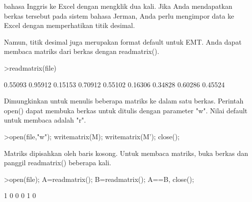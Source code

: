 \documentclass[a4paper,10pt]{article}
\begin{document}
\begin{eulernotebook}
\begin{eulercomment}
\begin{eulercomment}
\begin{eulercomment}
\begin{eulercomment}
\begin{eulercomment}
\begin{eulercomment}
\begin{eulercomment}
\begin{eulercomment}
\begin{eulercomment}
\begin{eulercomment}
\begin{eulercomment}
\begin{eulercomment}
\begin{eulercomment}
\begin{eulercomment}
\begin{eulercomment}
\begin{eulercomment}
\begin{eulercomment}
\begin{eulercomment}
\begin{eulercomment}
\begin{eulercomment}
\begin{eulercomment}
\begin{eulercomment}
\begin{eulercomment}
\begin{eulercomment}
\begin{eulercomment}
\begin{eulercomment}
\begin{eulercomment}
\begin{eulercomment}
\begin{eulercomment}
\begin{eulercomment}
\begin{eulercomment}
\begin{eulercomment}
\begin{eulercomment}
\begin{eulercomment}
\begin{eulercomment}
\begin{eulercomment}
\begin{eulercomment}
\begin{eulercomment}
\begin{eulercomment}
\begin{eulercomment}
\begin{eulercomment}
\begin{eulercomment}
\begin{eulercomment}
\begin{eulercomment}
\begin{eulercomment}
\begin{eulercomment}
\begin{eulercomment}
\begin{eulercomment}
\begin{eulercomment}
\begin{eulercomment}
\begin{eulercomment}
\begin{eulercomment}
\begin{eulercomment}
\begin{eulercomment}
\begin{eulercomment}
\begin{eulercomment}
\begin{eulercomment}
\begin{eulercomment}
\begin{eulercomment}
\begin{eulercomment}
\begin{eulercomment}
\begin{eulercomment}
\begin{eulercomment}
\begin{eulercomment}
\begin{eulercomment}
\begin{eulercomment}
\begin{eulercomment}
\begin{eulercomment}
\begin{eulercomment}
\begin{eulercomment}
\begin{eulercomment}
bahasa Inggris ke Excel dengan
mengklik dua kali. Jika Anda mendapatkan berkas tersebut pada sistem
bahasa Jerman, Anda perlu mengimpor data ke Excel dengan memperhatikan
titik desimal.

Namun, titik desimal juga merupakan format default untuk EMT. Anda
dapat membaca matriks dari berkas dengan readmatrix().
\end{eulercomment}
\begin{eulerprompt}
>readmatrix(file)
\end{eulerprompt}
\begin{euleroutput}
    0.55093   0.95912   0.15153 
    0.70912   0.55102   0.16306 
    0.34828   0.60286   0.45524 
\end{euleroutput}
\begin{eulercomment}
Dimungkinkan untuk menulis beberapa matriks ke dalam satu berkas.
Perintah open() dapat membuka berkas untuk ditulis dengan parameter
"w". Nilai default untuk membaca adalah "r".
\end{eulercomment}
\begin{eulerprompt}
>open(file,"w"); writematrix(M); writematrix(M'); close();
\end{eulerprompt}
\begin{eulercomment}
Matriks dipisahkan oleh baris kosong. Untuk membaca matriks, buka
berkas dan panggil readmatrix() beberapa kali.
\end{eulercomment}
\begin{eulerprompt}
>open(file); A=readmatrix(); B=readmatrix(); A==B, close();
\end{eulerprompt}
\begin{euleroutput}
          1         0         0 
          0         1         0 
     
\end{euleroutput}
\end{eulercomment}
\end{eulercomment}
\end{eulercomment}
\end{eulercomment}
\end{eulercomment}
\end{eulercomment}
\end{eulercomment}
\end{eulercomment}
\end{eulercomment}
\end{eulercomment}
\end{eulercomment}
\end{eulercomment}
\end{eulercomment}
\end{eulercomment}
\end{eulercomment}
\end{eulercomment}
\end{eulercomment}
\end{eulercomment}
\end{eulercomment}
\end{eulercomment}
\end{eulercomment}
\end{eulercomment}
\end{eulercomment}
\end{eulercomment}
\end{eulercomment}
\end{eulercomment}
\end{eulercomment}
\end{eulercomment}
\end{eulercomment}
\end{eulercomment}
\end{eulercomment}
\end{eulercomment}
\end{eulercomment}
\end{eulercomment}
\end{eulercomment}
\end{eulercomment}
\end{eulercomment}
\end{eulercomment}
\end{eulercomment}
\end{eulercomment}
\end{eulercomment}
\end{eulercomment}
\end{eulercomment}
\end{eulercomment}
\end{eulercomment}
\end{eulercomment}
\end{eulercomment}
\end{eulercomment}
\end{eulercomment}
\end{eulercomment}
\end{eulercomment}
\end{eulercomment}
\end{eulercomment}
\end{eulercomment}
\end{eulercomment}
\end{eulercomment}
\end{eulercomment}
\end{eulercomment}
\end{eulercomment}
\end{eulercomment}
\end{eulercomment}
\end{eulercomment}
\end{eulercomment}
\end{eulercomment}
\end{eulercomment}
\end{eulercomment}
\end{eulercomment}
\end{eulercomment}
\end{eulercomment}
\end{eulercomment}
\end{eulernotebook}
\end{document}
